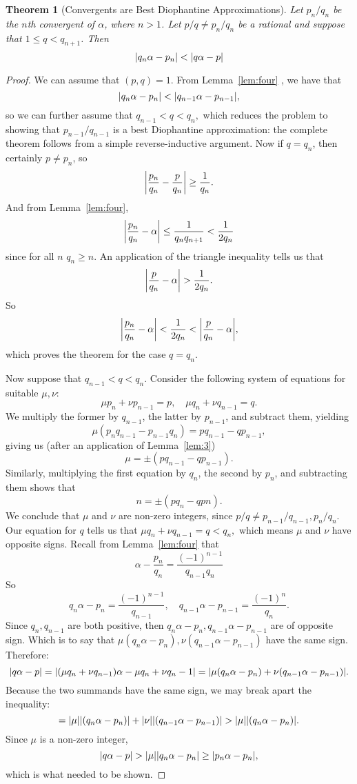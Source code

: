 \documentclass[12pt, letterpaper, oneside]{book}
\newcommand{\ga}{\ensuremath{\alpha}}
\newcommand{\gm}{\ensuremath{\mu}}
\newcommand{\gn}{\ensuremath{\nu}}
\DeclarePairedDelimiter{\abs}{\lvert}{\rvert}
\theoremstyle{plain}
\newtheorem{theorem}{Theorem}
\theoremstyle{definition}
\theoremstyle{remark}
\begin{document}
\begin{theorem}[Convergents are Best Diophantine Approximations]\label{thm:best_approx}
Let $p_n/q_n$ be the $n$th convergent of $\ga$, where $n>1$. Let $p/q\neq p_n/q_n$ be a rational and suppose that $1\leq q < q_{n+1}$. Then
\[
\abs{q_n\ga - p_n} < \abs{q\ga - p}
\]
\end{theorem}
\begin{proof}
We can assume that $(p,q)=1$. From Lemma~\ref{lem:four} , we have that
\[
\abs{q_n\ga - p_n} < \abs{q_{n-1}\ga - p_{n-1}},
\]
so we can further assume that $q_{n-1} < q < q_n,$ which reduces the problem to showing that $p_{n-1}/q_{n-1}$ is a best Diophantine approximation: the complete theorem follows from a simple reverse-inductive argument. Now if $q=q_n$, then certainly $p\neq p_n$, so
\[
\abs*{\frac{p_n}{q_n} - \frac{p}{q_n}}\geq\frac{1}{q_n}.
\]
And from Lemma~\ref{lem:four},
\[
\abs*{\frac{p_n}{q_n} - \ga}\leq\frac{1}{q_nq_{n+1}}<\frac{1}{2q_n} 
\]
since for all $n$ $q_n\geq n.$ An application of the triangle inequality tells us that 
\[
\abs*{\frac{p}{q_n}-\ga} > \frac{1}{2q_n}.
\]
So 
\[
\abs*{\frac{p_n}{q_n} - \ga} < \frac{1}{2q_n} <\abs*{\frac{p}{q_n} - \ga},
\]
which proves the theorem for the case $q = q_n$. 

Now suppose that $q_{n-1} < q < q_n$.
Consider the following system of equations for suitable $\gm, \gn$:
\[
\mu p_n + \nu p_{n-1} = p, \quad \mu q_n + \nu q_{n-1} = q.
\]
We multiply the former by $q_{n-1}$, the latter by $p_{n-1}$, and subtract them, yielding
\[
\mu(p_nq_{n-1} - p_{n-1}q_n)  = pq_{n-1} - qp_{n-1},
\]
giving us (after an application of Lemma~\ref{lem:3})
\[
\mu = \pm(pq_{n-1} - qp_{n-1}).
\]
Similarly, multiplying the first equation by $q_n$, the second by $p_n$, and subtracting them shows that
\[
n = \pm(pq_n - qpn).
\]
We conclude that $\mu$ and $\nu$ are non-zero integers, since $p/q \neq p_{n-1}/q_{n-1},p_n/q_n$. Our equation for $q$ tells us that $\mu q_n + \nu q_{n-1} = q  < q_n,$ which means $\mu$ and $\nu$ have opposite signs. Recall from Lemma~\ref{lem:four} that 
\[
 \ga - \frac{p_n}{q_n} = \frac{(-1)^{n-1}}{q_{n-1}q_n}
\]
So 
\[
q_n\ga-p_n=\frac{(-1)^{n-1}}{q_{n-1}}, \quad q_{n-1}\ga-p_{n-1} = \frac{(-1)^{n}}{q_{n}}.
\]
Since $q_n,q_{n-1}$ are both positive, then $q_n\ga-p_n,q_{n-1}\ga-p_{n-1}$ are of opposite sign. Which is to say that $\mu(q_n\ga-p_n),\nu(q_{n-1}\ga-p_{n-1})$ have the same sign. 
Therefore:
\[
\abs{q\ga - p} = \abs{(\mu q_n + \nu q_{n-1})\ga - \mu q_n + \nu q_n-1} = \abs{\mu(q_n\ga-p_n) + \nu(q_{n-1}\ga - p_{n-1})}.
\]
Because the two summands have the same sign, we may break apart the inequality:
\[
= \abs{\mu}\abs{(q_n\ga-p_n)} + \abs{\nu}\abs{(q_{n-1}\ga - p_{n-1})} > \abs{\mu}\abs{(q_n\ga-p_n)}.
\]
Since $\mu$ is a non-zero integer, 
\[
\abs{q\ga-p} > \abs{\mu}\abs{q_n\ga-p_n} \geq \abs{p_n\ga - p_n},
\]
which is what needed to be shown.
\end{proof}
\end{document}
